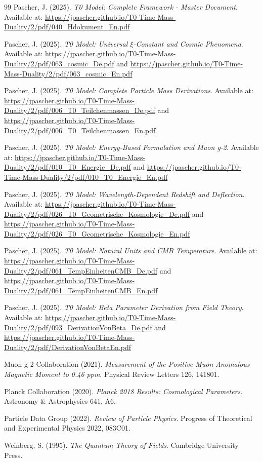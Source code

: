 	\begin{thebibliography}{99}
		Pascher, J. (2025). \textit{T0 Model: Complete Framework - Master Document}. Available at: \url{https://jpascher.github.io/T0-Time-Mass-Duality/2/pdf/040_Hdokument_En.pdf}
		
		Pascher, J. (2025). \textit{T0 Model: Universal $\xi$-Constant and Cosmic Phenomena}. Available at: \url{https://jpascher.github.io/T0-Time-Mass-Duality/2/pdf/063_cosmic_De.pdf} and \url{https://jpascher.github.io/T0-Time-Mass-Duality/2/pdf/063_cosmic_En.pdf}
		
		Pascher, J. (2025). \textit{T0 Model: Complete Particle Mass Derivations}. Available at: \url{https://jpascher.github.io/T0-Time-Mass-Duality/2/pdf/006_T0_Teilchenmassen_De.pdf} and \url{https://jpascher.github.io/T0-Time-Mass-Duality/2/pdf/006_T0_Teilchenmassen_En.pdf}
		
		Pascher, J. (2025). \textit{T0 Model: Energy-Based Formulation and Muon g-2}. Available at: \url{https://jpascher.github.io/T0-Time-Mass-Duality/2/pdf/010_T0_Energie_De.pdf} and \url{https://jpascher.github.io/T0-Time-Mass-Duality/2/pdf/010_T0_Energie_En.pdf}
		
		Pascher, J. (2025). \textit{T0 Model: Wavelength-Dependent Redshift and Deflection}. Available at: \url{https://jpascher.github.io/T0-Time-Mass-Duality/2/pdf/026_T0_Geometrische_Kosmologie_De.pdf} and \url{https://jpascher.github.io/T0-Time-Mass-Duality/2/pdf/026_T0_Geometrische_Kosmologie_En.pdf}
		
		Pascher, J. (2025). \textit{T0 Model: Natural Units and CMB Temperature}. Available at: \url{https://jpascher.github.io/T0-Time-Mass-Duality/2/pdf/061_TempEinheitenCMB_De.pdf} and \url{https://jpascher.github.io/T0-Time-Mass-Duality/2/pdf/061_TempEinheitenCMB_En.pdf}
		
		Pascher, J. (2025). \textit{T0 Model: Beta Parameter Derivation from Field Theory}. Available at: \url{https://jpascher.github.io/T0-Time-Mass-Duality/2/pdf/093_DerivationVonBeta_De.pdf} and \url{https://jpascher.github.io/T0-Time-Mass-Duality/2/pdf/DerivationVonBetaEn.pdf}
		
		Muon g-2 Collaboration (2021). \textit{Measurement of the Positive Muon Anomalous Magnetic Moment to 0.46 ppm}. Physical Review Letters 126, 141801.
		
		Planck Collaboration (2020). \textit{Planck 2018 Results: Cosmological Parameters}. Astronomy \& Astrophysics 641, A6.
		
		Particle Data Group (2022). \textit{Review of Particle Physics}. Progress of Theoretical and Experimental Physics 2022, 083C01.
		
		Weinberg, S. (1995). \textit{The Quantum Theory of Fields}. Cambridge University Press.
	\end{thebibliography}

